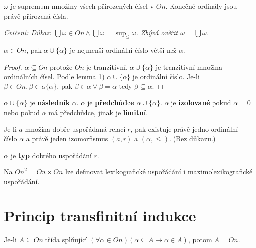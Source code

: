\begin{dusl}
	$\omega$ je supremum množiny všech přirozených čísel v $On$. Konečné ordinály jsou právě přirozená čísla.
\end{dusl}

\textit{Cvičení: Důkaz: $\bigcup \omega \in On \land \bigcup \omega = \sup_{\leq}\omega$. Zbývá ověřit $\omega = \bigcup \omega$.}

\begin{lemma}
	$\alpha \in On$, pak $\alpha \cup \{\alpha\}$ je nejmenší ordinální číslo větší než $\alpha$.
\end{lemma}

\begin{proof}
	$\alpha \subseteq On$ protože $On$ je tranzitivní. $\alpha \cup \{\alpha\}$ je tranzitivní množina ordinálních čísel. Podle lemma 1) $\alpha \cup \{\alpha\}$ je ordinální číslo. Je-li $\beta \in On, \beta \in \alpha \{\alpha\}$, pak $\beta \in \alpha \lor \beta = \alpha$ tedy $\beta \subseteq \alpha$.
\end{proof}

\begin{definice}
	$\alpha \cup \{\alpha\}$ je \textbf{následník} $\alpha$. $\alpha$ je \textbf{předchůdce} $\alpha \cup \{\alpha\}$. $\alpha$ je \textbf{izolované} pokud $\alpha = 0$ nebo pokud $\alpha$ má předchůdce, jinak je \textbf{limitní}.
\end{definice}

\begin{thm}
	Je-li $a$ množina dobře uspořádaná relací $r$, pak existuje právě jedno ordinální číslo $\alpha$ a právě jeden izomorfismus $(a,r)$ a $(\alpha, \leq)$. (Bez důkazu.)
\end{thm}

\begin{definice}
	$\alpha$ je \textbf{typ} dobrého uspořádání $r$.
\end{definice}

\begin{pozn}
	Na ${On}^{2} = On \times On$ lze definovat lexikografické uspořádání i maximolexikografické uspořádání.
\end{pozn}

\section{Princip transfinitní indukce}

Je-li $A \subseteq On$ třída splňující $(\forall \alpha \in On)(\alpha \subseteq A \rightarrow \alpha \in A)$, potom $A = On$.

